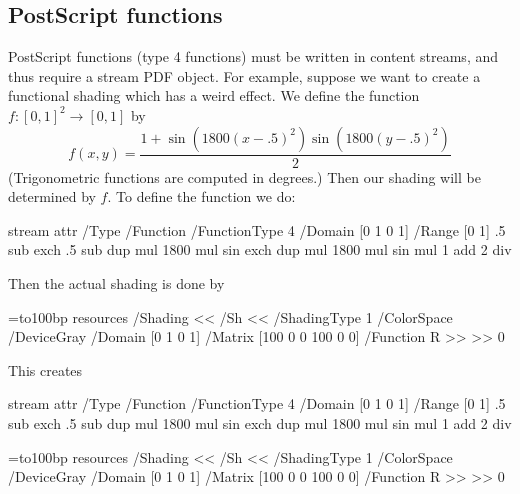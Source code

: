 \centerline{\donutdonut}

\subsection{PostScript functions}

PostScript functions (type 4 functions) must be written in content streams, and thus require a stream
PDF object.
For example, suppose we want to create a functional shading which has a weird effect.
We define the function $f\colon[0,1]^2\to[0,1]$ by
$$ f(x,y) = \frac{1+\sin(1800(x-.5)^2)\sin(1800(y-.5)^2)}2 $$
(Trigonometric functions are computed in degrees.)
Then our shading will be determined by $f$.
To define the function we do:

\blisting
\immediate\pdfobj stream attr{
    /Type /Function
    /FunctionType 4
    /Domain [0 1 0 1]
    /Range [0 1]
}{{
    .5 sub
    exch
    .5 sub
    dup
    mul
    1800 mul
    sin
    exch
    dup
    mul
    1800 mul
    sin
    mul
    1 add
    2 div
}}
\elisting

Then the actual shading is done by

\blisting
\bgroup
{}=\hbox to100bp{\vrule width0bp height100bp depth0bp%
\hfil}
\pdfxform resources {
    /Shading << /Sh <<
        /ShadingType 1
        /ColorSpace /DeviceGray
        /Domain [0 1 0 1]
        /Matrix [100 0 0 100 0 0]
        /Function \the\pdflastobj{} R
    >> >>
}0
\egroup
\elisting

This creates

\immediate\pdfobj stream attr{
    /Type /Function
    /FunctionType 4
    /Domain [0 1 0 1]
    /Range [0 1]
}{{
    .5 sub
    exch
    .5 sub
    dup
    mul
    1800 mul
    sin
    exch
    dup
    mul
    1800 mul
    sin
    mul
    1 add
    2 div
}}

\bgroup
{}=\hbox to100bp{\vrule width0bp height100bp depth0bp%
\hfil}
\pdfxform resources {
    /Shading << /Sh <<
        /ShadingType 1
        /ColorSpace /DeviceGray
        /Domain [0 1 0 1]
        /Matrix [100 0 0 100 0 0]
        /Function \the\pdflastobj{} R
    >> >>
}0

\centerline{\pdfrefxform\pdflastxform}
\egroup


